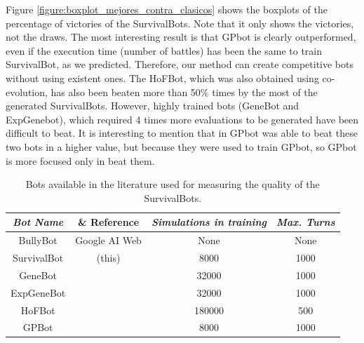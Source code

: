\documentclass[conference]{IEEEtran}
\begin{document}
Figure \ref{figure:boxplot_mejores_contra_clasicos} shows the boxplots of the percentage of victories of the SurvivalBots. Note that it only shows the victories, not the draws. The most interesting result is that GPbot is clearly outperformed, even if the execution time (number of battles) has been the same to train SurvivalBot, as we predicted. Therefore, our method can create competitive bots without using existent ones. The HoFBot, which was also obtained using co-evolution, has also been beaten more than 50\% times by the most of the generated SurvivalBots. However, highly trained bots (GeneBot and ExpGenebot), which required 4 times more evaluations to be generated have been difficult to beat. It is interesting to mention that in \cite{GarciaGP14} GPbot was able to beat these two bots in a higher value, but because they were used to train GPbot, so GPbot is more focused only in beat them.

\begin{table}
\begin{center}
\begin{tabular}{|c|c|c|c|}
\hline
{\em Bot Name} & {\& Reference} & {\em Simulations in training} & {\em Max. Turns} \\\hline \hline
BullyBot & Google AI Web & None & None \\ \hline
SurvivalBot & (this) & 8000 & 1000 \\ \hline
GeneBot & \cite{Genebot_JCST} & 32000 & 1000 \\ \hline
ExpGeneBot & \cite{Genebot_CIG2012} & 32000 & 1000 \\ \hline
HoFBot & \cite{NogueiraCoevolutionary14} & 180000 & 500 \\ \hline
GPBot & \cite{GarciaGP14} & 8000 & 1000 \\ \hline


\end{tabular}
\caption{Bots available in the literature used for measuring the quality of the SurvivalBots.}     %
\label{tab:literaturebots}
\end{center}
\end{table}
\end{document}
